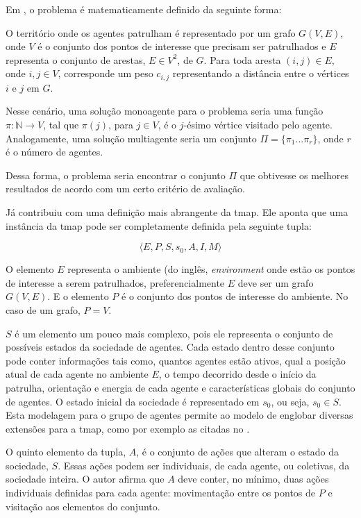 Em \citep{Chevaleyre:2004:TAM:1018411.1019013}, o problema é matematicamente 
definido da seguinte forma:

O território onde os agentes patrulham é representado por um grafo $G(V,E)$, 
onde $V$ é o conjunto dos pontos de interesse que precisam ser patrulhados e 
$E$ representa o conjunto de arestas, $E \in V^{2}$, de $G$. Para toda aresta 
$(i,j) \in E$, onde $i,j \in V$, corresponde um peso $c_{i,j}$ representando a 
distância entre o vértices $i$ e $j$ em $G$. 

Nesse cenário, uma solução monoagente para o problema seria uma função 
$ \pi : \mathbb{N} \longrightarrow V$, tal que $ \pi (j)$, para $j \in V$, é o 
$j$-ésimo vértice visitado pelo agente. Analogamente, uma solução multiagente 
seria um conjunto $ \Pi = \{ \pi_{1} ... \pi_{r} \}$, onde $r$ é o número de 
agentes.

Dessa forma, o problema seria encontrar o conjunto $ \Pi $ que obtivesse os 
melhores resultados de acordo com um certo critério de avaliação.

Já \citep{sampaiophd} contribuiu com uma definição mais abrangente da \ac{tmap}. 
Ele aponta que uma instância da \ac{tmap} pode ser completamente definida pela 
seguinte tupla: 

$$ \langle E, P, S, s_{0}, A, I, M \rangle $$

O elemento $E$ representa o ambiente (do inglês, \textit{environment} onde estão 
os pontos de interesse a serem patrulhados, preferencialmente $E$ deve ser um 
grafo $G(V,E)$. E o elemento $P$ é o conjunto dos pontos de interesse do ambiente. 
No caso de um grafo, $P = V$.

$S$ é um elemento um pouco mais complexo, pois ele 
representa o conjunto de possíveis estados da sociedade de agentes. Cada estado 
dentro desse conjunto pode conter informações tais como, quantos agentes estão 
ativos, qual a posição atual de cada agente no ambiente $E$, o tempo decorrido 
desde o início da patrulha, orientação e energia de cada agente e 
características globais do conjunto de agentes. O estado inicial da sociedade é 
representado em $s_{0}$, ou seja, $s_{0} \in S$. Esta modelagem para o grupo de 
agentes permite ao modelo de \citep{sampaiophd} englobar diversas extensões para 
a \ac{tmap}, como por exemplo as citadas no .

O quinto elemento da tupla, $A$, é o conjunto de ações que alteram o estado da 
sociedade, $S$. Essas ações podem ser individuais, de cada agente, ou coletivas, 
da sociedade inteira. O autor afirma que $A$ deve conter, no mínimo, duas ações 
individuais definidas para cada agente: movimentação entre os pontos de $P$ e 
visitação aos elementos do conjunto.

